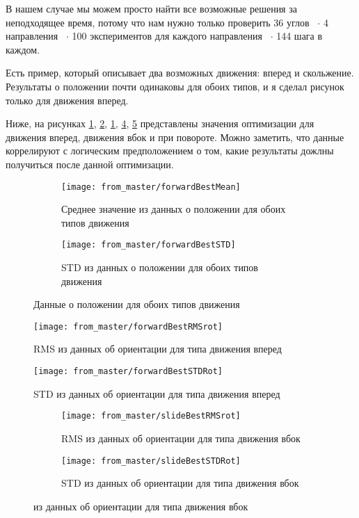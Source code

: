 В нашем случае мы можем просто найти все возможные решения за неподходящее время, потому что нам нужно только проверить 36 углов ~$\cdot$ 4 направления ~$\cdot$ 100 экспериментов для каждого направления ~$\cdot$ 144 шага в каждом.


Есть пример, который описывает два возможных движения: вперед и скольжение. Результаты о положении почти одинаковы для обоих типов, и я сделал рисунок только для движения вперед.

Ниже, на рисунках \ref{fig:forwardBestMean}, \ref{fig:forwardBestSTD}, \ref{fig:forwardBestMean}, \ref{fig:forwardBestRMSrot}, \ref{fig:forwardBestSTDRot} представлены значения оптимизации для движения вперед, движения вбок и при повороте. Можно заметить, что данные коррелируют с логическим предположением о том, какие результаты дожлны получиться после данной оптимизации.

\begin{figure}[H]
\begin{subfigure}{1\textwidth}
\centering\texttt{[image: from\_master/forwardBestMean]} 
\caption{Среднее значение из данных о положении для обоих типов движения}
\label{fig:forwardBestMean}
\end{subfigure}

\begin{subfigure}{1\textwidth}
\centering\texttt{[image: from\_master/forwardBestSTD]} 
\caption{STD из данных о положении для обоих типов движения}
\label{fig:forwardBestSTD}
\end{subfigure}
 
\caption{Данные о положении для обоих типов движения}
\label{fig:forwardPosion}
\end{figure}

\begin{figure}[H]
\centering\texttt{[image: from\_master/forwardBestRMSrot]} 
\caption{RMS из данных об ориентации для типа движения вперед}
\label{fig:forwardBestRMSrot}
\end{figure}

\begin{figure}[H]
\centering\texttt{[image: from\_master/forwardBestSTDRot]} 
\caption{STD из данных об ориентации для типа движения вперед}
\label{fig:forwardBestSTDRot}
\end{figure}

\begin{figure}[H]
\begin{subfigure}{1\textwidth}
\centering\texttt{[image: from\_master/slideBestRMSrot]} 
\caption{RMS из данных об ориентации для типа движения вбок}
\label{fig:slideBestRMSrot}
\end{subfigure}

\begin{subfigure}{1\textwidth}
\centering\texttt{[image: from\_master/slideBestSTDRot]} 
\caption{STD из данных об ориентации для типа движения вбок}
\label{fig:slideBestSTDRot}
\end{subfigure}
 
\caption{из данных об ориентации для типа движения вбок}
\label{fig:slideOrientation}
\end{figure}

